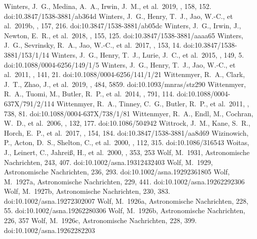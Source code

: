 \documentclass[twocolumn,tighten,twocolappendix]{aastex631}
\begin{document}
\begin{thebibliography}{}
 Winters, J.~G., Medina, A.~A., Irwin, J.~M., et al.\ 2019, \aj, 158, 152. doi:10.3847/1538-3881/ab364d
 Winters, J.~G., Henry, T.~J., Jao, W.-C., et al.\ 2019b, \aj, 157, 216. doi:10.3847/1538-3881/ab05dc
 Winters, J.~G., Irwin, J., Newton, E.~R., et al.\ 2018, \aj, 155, 125. doi:10.3847/1538-3881/aaaa65
 Winters, J.~G., Sevrinsky, R.~A., Jao, W.-C., et al.\ 2017, \aj, 153, 14. doi:10.3847/1538-3881/153/1/14
 Winters, J.~G., Henry, T.~J., Lurie, J.~C., et al.\ 2015, \aj, 149, 5. doi:10.1088/0004-6256/149/1/5
 Winters, J.~G., Henry, T.~J., Jao, W.-C., et al.\ 2011, \aj, 141, 21. doi:10.1088/0004-6256/141/1/21
 Wittenmyer, R.~A., Clark, J.~T., Zhao, J., et al.\ 2019, \mnras, 484, 5859. doi:10.1093/mnras/stz290
 Wittenmyer, R.~A., Tuomi, M., Butler, R.~P., et al.\ 2014, \apj, 791, 114. doi:10.1088/0004-637X/791/2/114
 Wittenmyer, R.~A., Tinney, C.~G., Butler, R.~P., et al.\ 2011, \apj, 738, 81. doi:10.1088/0004-637X/738/1/81
 Wittenmyer, R.~A., Endl, M., Cochran, W.~D., et al.\ 2006, \aj, 132, 177. doi:10.1086/504942
 Wittrock, J.~M., Kane, S.~R., Horch, E.~P., et al.\ 2017, \aj, 154, 184. doi:10.3847/1538-3881/aa8d69
 Wizinowich, P., Acton, D.~S., Shelton, C., et al.\ 2000, \pasp, 112, 315. doi:10.1086/316543
 Woitas, J., Leinert, C., Jahrei{\ss}, H., et al.\ 2000, \aap, 353, 253
 Wolf, M.\ 1931, Astronomische Nachrichten, 243, 407. doi:10.1002/asna.19312432403
 Wolf, M.\ 1929, Astronomische Nachrichten, 236, 293. doi:10.1002/asna.19292361805
 Wolf, M.\ 1927a, Astronomische Nachrichten, 229, 441. doi:10.1002/asna.19262292306
 Wolf, M.\ 1927b, Astronomische Nachrichten, 230, 383. doi:10.1002/asna.19272302007
 Wolf, M.\ 1926a, Astronomische Nachrichten, 228, 55. doi:10.1002/asna.19262280306
 Wolf, M.\ 1926b, Astronomische Nachrichten, 226, 357
 Wolf, M.\ 1926c, Astronomische Nachrichten, 228, 399. doi:10.1002/asna.19262282203

\end{thebibliography}
\end{document}
